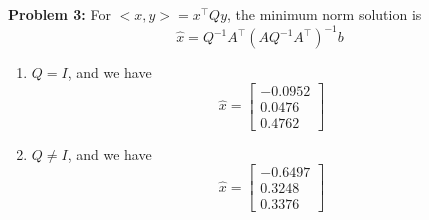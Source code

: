\documentclass[letterpaper]{article}
\begin{document}
\noindent \textbf{Problem 3:} For $<x,y>=x^\top Qy$, the minimum norm solution is
$$\hat{x}=Q^{-1}A^\top (AQ^{-1}A^\top)^{-1}b$$
\begin{enumerate}
\setlength{\itemsep}{.1in}
\renewcommand{\labelenumi}{(\alph{enumi})}
\item $Q=I$, and we have
$$\hat{x}=\left[\begin{array}{r} -0.0952 \\0.0476 \\ 0.4762\end{array} \right]$$

\item $Q\not=I$, and we have
$$\hat{x}=\left[\begin{array}{r} -0.6497 \\0.3248 \\ 0.3376\end{array} \right]$$
\end{enumerate}
\bigskip
\end{document}
